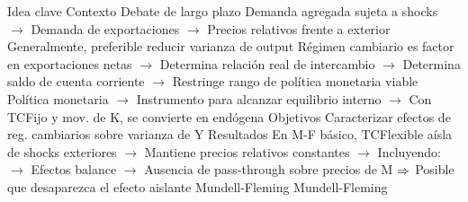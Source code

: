 \documentclass{nuevotema}
\begin{document}
\begin{esquemal}
			\3 Idea clave
				\4 Contexto
				\4[] Debate de largo plazo
				\4[] Demanda agregada sujeta a shocks
				\4[] $\to$ Demanda de exportaciones
				\4[] $\to$ Precios relativos frente a exterior
				\4[] Generalmente, preferible reducir varianza de output
				\4[] Régimen cambiario es factor en exportaciones netas
				\4[] $\to$ Determina relación real de intercambio
				\4[] $\to$ Determina saldo de cuenta corriente
				\4[] $\to$ Restringe rango de política monetaria viable
				\4[] Política monetaria
				\4[] $\to$ Instrumento para alcanzar equilibrio interno
				\4[] $\to$ Con TCFijo y mov. de K, se convierte en endógena
				\4 Objetivos
				\4[] Caracterizar efectos de reg. cambiarios sobre varianza de Y
				\4 Resultados
				\4[] En M-F básico, TCFlexible aísla de shocks exteriores
				\4[] $\to$ Mantiene precios relativos constantes
				\4[] $\to$ 
				\4[] Incluyendo:
				\4[] $\to$ Efectos balance
				\4[] $\to$ Ausencia de pass-through sobre precios de M
				\4[] $\Rightarrow$ Posible que desaparezca el efecto aislante
			\3 Mundell-Fleming
				\4 Mundell-Fleming
				

\end{esquemal}
\end{document}
